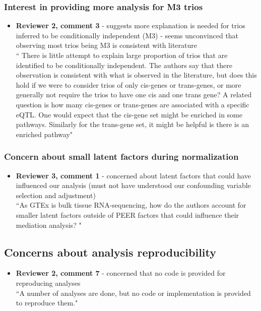 \documentclass[a4paper,12pt]{article}
\begin{document}
	\subsubsection*{Interest in providing more analysis for M3 trios}
	\begin{itemize}
		\item \textbf{Reviewer 2, comment 3} - suggests more explanation is needed for trios inferred to be conditionally independent (M3)
		- seems unconvinced that observing most trios being M3 is consistent with literature\\
		
		`` There is little attempt to explain large proportion of trios that are identified to be conditionally independent. The authors say that there observation is consistent with what is observed in the literature, but does this hold if we were to consider trios of only cis-genes or trans-genes, or more generally not require the trios to have one cis and one trans gene? A related question is how many cis-genes or trans-genes are associated with a specific eQTL. One would expect that the cis-gene set might be enriched in some pathways. Similarly for the trans-gene set, it might be helpful is there is an enriched pathway"
		
	\end{itemize}
	
	\subsubsection*{Concern about small latent factors during normalization}
	\begin{itemize}
		\item \textbf{Reviewer 3, comment 1} - concerned about latent factors that could have influenced our analysis (must not have understood our confounding variable selection and adjustment)\\
		
		``As GTEx is bulk tissue RNA-sequencing, how do the authors account for smaller latent factors outside of PEER factors that could influence their mediation analysis? "
		
	\end{itemize}
	
	
	\subsection*{Concerns about analysis reproducibility}
	\begin{itemize}
		\item \textbf{Reviewer 2, comment 7} - concerned that no code is provided for reproducing analyses \\
		
		``A number of analyses are done, but no code or implementation is provided to reproduce them."
		
	\end{itemize}
	
\end{document}
